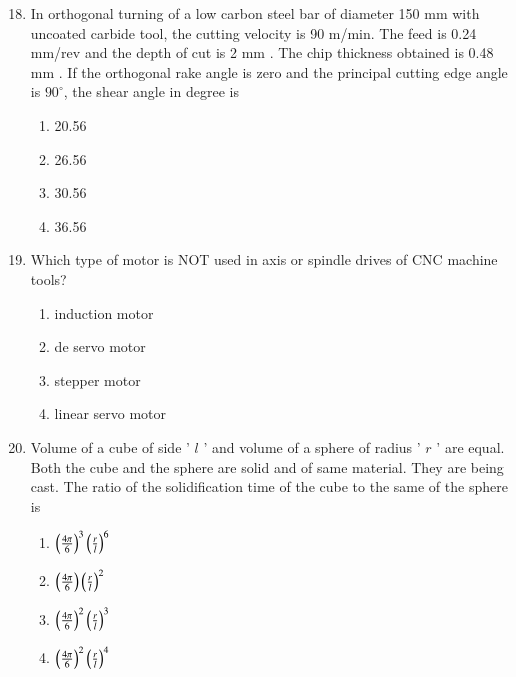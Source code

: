 \documentclass[journal]{IEEEtran}
\begin{document}
\begin{enumerate}
\setcounter{enumi}{17}
 

    \item In orthogonal turning of a low carbon steel bar of diameter 150 mm with uncoated carbide tool, the cutting velocity is 90 m/min. The feed is 0.24 mm/rev and the depth of cut is 2 mm . The chip thickness obtained is 0.48 mm . If the orthogonal rake angle is zero and the principal cutting edge angle is $90^{\circ}$, the shear angle in degree is
        \begin{multicols}{4}
            \begin{enumerate}
                \item 20.56
                \item 26.56
                \item 30.56
                \item 36.56
            \end{enumerate}
        \end{multicols}


    \item Which type of motor is NOT used in axis or spindle drives of CNC machine tools?


		\begin{multicols}{1}
			\begin{enumerate}
	\item induction motor
    \item de servo motor
    \item stepper motor
    \item linear servo motor
			\end{enumerate}
		\end{multicols}


    \item Volume of a cube of side ' $l$ ' and volume of a sphere of radius ' $r$ ' are equal. Both the cube and the sphere are solid and of same material. They are being cast. The ratio of the solidification time of the cube to the same of the sphere is
        \begin{multicols}{4}
            \begin{enumerate}
              \item $\left(\frac{4 \pi}{6}\right)^{3}\left(\frac{r}{l}\right)^{6}$
              \item $\left(\frac{4 \pi}{6}\right)\left(\frac{r}{l}\right)^{2}$
              \item $\left(\frac{4 \pi}{6}\right)^{2}\left(\frac{r}{l}\right)^{3}$
              \item $\left(\frac{4 \pi}{6}\right)^{2}\left(\frac{r}{l}\right)^{4}$
            \end{enumerate}
        \end{multicols}



\end{enumerate}
\end{document}

